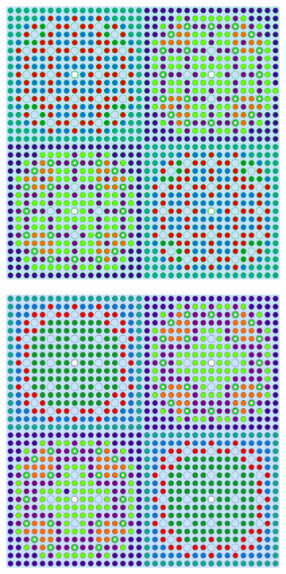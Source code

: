 \begin{figure}[h!]
\begin{subfigure}{0.47\textwidth}
  \caption{}
  \label{fig:chap10-2x2-combined-2}
\end{subfigure}
\begin{subfigure}{0.47\textwidth}
  \centering
  \includegraphics[width=0.9\linewidth]{figures/unsupervised/geometries/with-features/4-clusters/pinch/2x2}
  \caption{}
  \label{fig:chap10-2x2-pinch-4}
\end{subfigure}%
\begin{subfigure}{0.47\textwidth}
  \centering
  \includegraphics[width=0.9\linewidth]{figures/unsupervised/geometries/with-features/4-clusters/combined/2x2}

\end{subfigure}
\end{figure}
